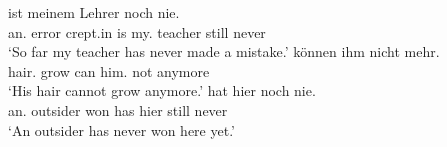 \documentclass[output=paper
	        ,collection
	        ,collectionchapter
 	        ,biblatex
                ,babelshorthands
                ,newtxmath
                ,draftmode
                ,colorlinks, citecolor=brown
]{langscibook}
\begin{document}
\begin{exe}
\ex\label{ex:erg-subj-fronted}
  \begin{xlist}
  \ex\label{ex:erg-subj-fronted-indef} ist meinem Lehrer noch nie.\\
         {\LB}an.\nom{} error {crept.in} is my.\dat{} teacher still never\\
         \trans `So far my teacher has never made a mistake.'
  \ex{} können ihm nicht mehr.\\
          {\LB}hair.\nom{} grow can him.\dat{} not anymore\\
          \trans `His hair cannot grow anymore.'
\ex\label{ex:nonerg-subj-fronted}
       hat hier noch nie.\\
           {\LB}an.\nom{} outsider won has hier still never\\
        \trans `An outsider has never won here yet.' 
  \end{xlist}
\end{exe}
\end{document}
